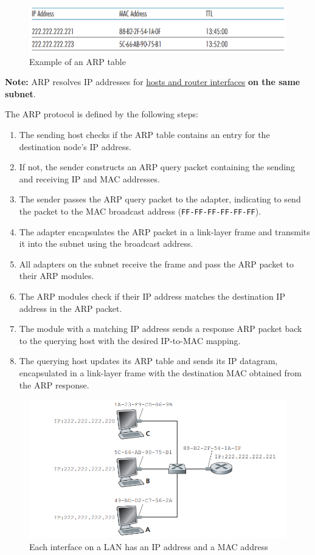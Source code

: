 \begin{figure}[H]
    \centering
    \includegraphics[width = 0.75\linewidth]{img/5/ARP-table.png}
    \caption{Example of an ARP table \cite{Kurose2017}}
    \label{fig:ARP-table}
\end{figure}

\noindent\textbf{Note:} ARP resolves IP addresses for \underline{hosts and router interfaces} \textbf{on the same subnet}.

\vspace{1 em}
\noindent The ARP protocol is defined by the following steps:

\begin{enumerate}
    \item The sending host checks if the ARP table contains an entry for the destination node's IP address.
    \item If not, the sender constructs an ARP query packet containing the sending and receiving IP and MAC addresses.
    \item The sender passes the ARP query packet to the adapter, indicating to send the packet to the MAC broadcast address (\texttt{FF-FF-FF-FF-FF-FF}).
    \item The adapter encapsulates the ARP packet in a link-layer frame and transmits it into the subnet using the broadcast address.
    \item All adapters on the subnet receive the frame and pass the ARP packet to their ARP modules.
    \item The ARP modules check if their IP address matches the destination IP address in the ARP packet.
    \item The module with a matching IP address sends a response ARP packet back to the querying host with the desired IP-to-MAC mapping.
    \item The querying host updates its ARP table and sends its IP datagram, encapsulated in a link-layer frame with the destination MAC obtained from the ARP response.
\end{enumerate}

\begin{figure}[H]
    \centering
    \includegraphics[width = 0.7\linewidth]{img/5/MAC-IP-LAN.png}
    \caption{Each interface on a LAN has an IP address and a MAC address \cite{Kurose2017}}
    \label{fig:MAC-IP-LAN}
\end{figure}

